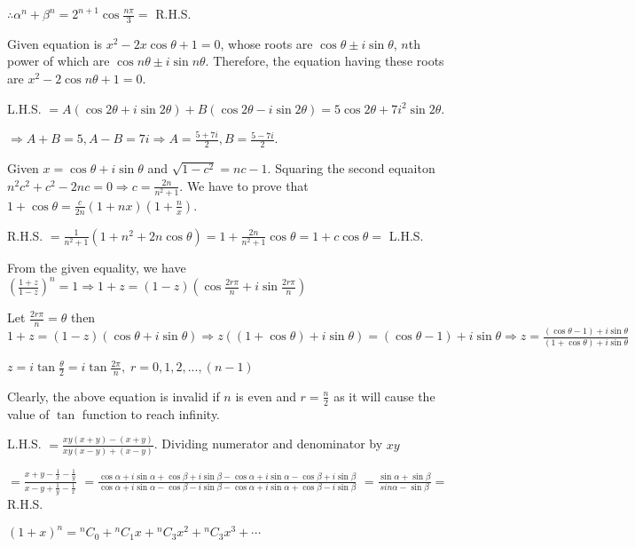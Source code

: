   $\therefore \alpha^n + \beta^n = 2^{n + 1}\cos\frac{n\pi}{3} =$ R.H.S.
\item Given equation is $x^2 - 2x\cos\theta + 1 = 0$, whose roots are $\cos\theta \pm i\sin\theta$, $n$th
  power of which are $\cos n\theta \pm i\sin n\theta$. Therefore, the equation having these roots are $x^2 -
  2\cos n\theta + 1 = 0$.
\item L.H.S. $= A(\cos2\theta + i\sin2\theta) + B(\cos2\theta - i\sin2\theta) = 5\cos2\theta +
  7i^2\sin2\theta$.

  $\Rightarrow A + B = 5, A - B = 7i \Rightarrow A = \frac{5 + 7i}{2}, B = \frac{5 - 7i}{2}$.
\item Given $x = \cos\theta + i\sin\theta$ and $\sqrt{1 - c^2} = nc - 1$. Squaring the second equaiton
  $n^2c^2 + c^2 - 2nc  = 0 \Rightarrow c = \frac{2n}{n^2 + 1}$. We have to prove that $1 + \cos\theta =
  \frac{c}{2n}(1 + nx)\left(1 + \frac{n}{x}\right)$.

  R.H.S. $= \frac{1}{n^2 + 1}\left(1 + n^2 + 2n\cos\theta\right) = 1 + \frac{2n}{n^2 + 1}\cos\theta = 1 +
  c\cos\theta =$ L.H.S.
\item From the given equality, we have $\left(\frac{1+z}{1-z}\right)^n = 1\Rightarrow 1 + z = (1 -
  z)(\cos\frac{2r\pi}{n} +i \sin\frac{2r\pi}{n})$

  Let $\frac{2r\pi}{n} = \theta$ then $1 + z = (1 - z)(\cos\theta + i \sin\theta) \Rightarrow z((1 +
  \cos\theta) + i \sin\theta) = (\cos\theta - 1) + i \sin\theta
  \Rightarrow z = \frac{(\cos\theta - 1) + i \sin\theta}{(1 + \cos\theta) + i \sin\theta}$

  $z = i \tan\frac{\theta}{2} = i \tan\frac{2\pi}{n}, \; r = 0, 1, 2, ..., (n - 1)$

  Clearly, the above equation is invalid if $n$ is even and $r =
  \frac{n}{2}$ as it will cause the value of $\tan$ function to reach infinity.
\item L.H.S. $= \frac{xy(x + y) - (x + y)}{xy(x - y)+(x - y)}$. Dividing numerator and denominator by $xy$

  $= \frac{x + y - \frac{1}{x} - \frac{1}{y}}{x - y + \frac{1}{y} - \frac{1}{x}}$
  $= \frac{\cos\alpha + i \sin\alpha + \cos\beta + i \sin\beta -
  \cos\alpha + i\sin\alpha - \cos\beta + i \sin\beta}{\cos\alpha + i
  \sin\alpha - \cos\beta - i \sin\beta - \cos\alpha + i\sin\alpha +
  \cos\beta - i \sin\beta}$
  $= \frac{\sin\alpha + \sin\beta}{sin\alpha - \sin\beta} =$ R.H.S.
\item $(1 + x)^n = {^nC_0} + {^nC_1}x + {^nC_3}x^2 + {^nC_3}x^3 + \cdots$

